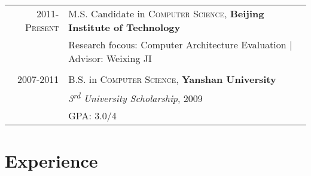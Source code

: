 \documentclass[a4paper,10pt]{article} %
\begin{document}
\begin{tabular}{rl}	
\textsc{2011-Present} & M.S. Candidate in \textsc{Computer Science}, \textbf{Beijing Institute of Technology} \\
& Research focous: Computer Architecture Evaluation | \small Advisor: Weixing JI\\
&\\


\textsc{2007-2011} & B.S. in \textsc{Computer Science}, \textbf{Yanshan University}\\
& \small\emph{3\textsuperscript{rd} University Scholarship}, 2009 \\
& \textsc{GPA}: 3.0/4 \\
\end{tabular}




\section{Experience}
\end{document}
